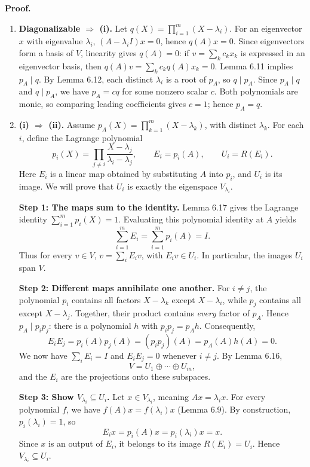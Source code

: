 \documentclass[11pt,a4paper]{article}
\newenvironment{proofsteps}{\begin{enumerate}\setlength{\itemsep}{4pt}}{\end{enumerate}}
\begin{document}
\textbf{Proof.}
\begin{proofsteps}
\item \textbf{Diagonalizable \(\Rightarrow\) (i).}
Let \(q(X)=\prod_{i=1}^m(X-\lambda_i)\).
For an eigenvector \(x\) with eigenvalue \(\lambda_i\),
\((A-\lambda_iI)x=0\), hence \(q(A)x=0\).
Since eigenvectors form a basis of \(V\), linearity gives \(q(A)=0\): if \(v=\sum_k c_kx_k\) is expressed in an eigenvector basis, then \(q(A)v=\sum_k c_kq(A)x_k=0\).
Lemma 6.11 implies \(p_A\mid q\).
By Lemma 6.12, each distinct \(\lambda_i\) is a root of \(p_A\),
so \(q\mid p_A\). Since \(p_A\mid q\) and \(q\mid p_A\), we have \(p_A=cq\) for some nonzero scalar \(c\). Both polynomials are monic, so comparing leading coefficients gives \(c=1\); hence \(p_A=q\).

\item \textbf{(i) \(\Rightarrow\) (ii).}
Assume \(p_A(X)=\prod_{k=1}^m(X-\lambda_k)\), with distinct \(\lambda_k\). For each \(i\), define the Lagrange polynomial
\[
p_i(X)=\prod_{j\neq i}\frac{X-\lambda_j}{\lambda_i-\lambda_j},
\qquad E_i=p_i(A),\qquad U_i=R(E_i).
\]
Here \(E_i\) is a linear map obtained by substituting \(A\) into \(p_i\), and \(U_i\) is its image. We will prove that \(U_i\) is exactly the eigenspace \(V_{\lambda_i}\).

\textbf{Step 1: The maps sum to the identity.}
Lemma 6.17 gives the Lagrange identity \(\sum_{i=1}^m p_i(X)=1\). Evaluating this polynomial identity at \(A\) yields
\[
\sum_{i=1}^m E_i=\sum_{i=1}^m p_i(A)=I.
\]
Thus for every \(v\in V\), \(v=\sum_iE_iv\), with \(E_iv\in U_i\). In particular, the images \(U_i\) span \(V\).

\textbf{Step 2: Different maps annihilate one another.}
For \(i\neq j\), the polynomial \(p_i\) contains all factors \(X-\lambda_k\) except \(X-\lambda_i\), while \(p_j\) contains all except \(X-\lambda_j\). Together, their product contains \emph{every} factor of \(p_A\). Hence \(p_A\mid p_ip_j\): there is a polynomial \(h\) with \(p_ip_j=p_Ah\). Consequently,
\[
E_iE_j=p_i(A)p_j(A)=(p_ip_j)(A)=p_A(A)h(A)=0.
\]
We now have \(\sum_iE_i=I\) and \(E_iE_j=0\) whenever \(i\neq j\). By Lemma 6.16,
\[
V=U_1\oplus\cdots\oplus U_m,
\]
and the \(E_i\) are the projections onto these subspaces.

\textbf{Step 3: Show \(V_{\lambda_i}\subseteq U_i\).}
Let \(x\in V_{\lambda_i}\), meaning \(Ax=\lambda_i x\). For every polynomial \(f\), we have \(f(A)x=f(\lambda_i)x\) (Lemma 6.9). By construction, \(p_i(\lambda_i)=1\), so
\[
E_ix=p_i(A)x=p_i(\lambda_i)x=x.
\]
Since \(x\) is an output of \(E_i\), it belongs to its image \(R(E_i)=U_i\). Hence \(V_{\lambda_i}\subseteq U_i\).


\end{proofsteps}
\end{document}

